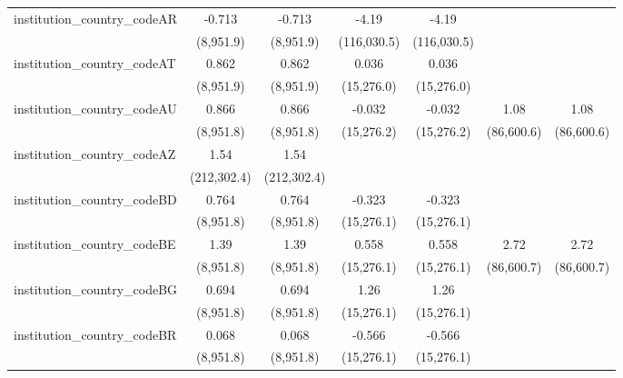 \begin{tabular}{lcccccc}
   institution\_country\_codeAR          & -0.713        & -0.713        & -4.19         & -4.19         &              &   \\   
                                         & (8,951.9)     & (8,951.9)     & (116,030.5)   & (116,030.5)   &              &   \\   
   institution\_country\_codeAT          & 0.862         & 0.862         & 0.036         & 0.036         &              &   \\   
                                         & (8,951.9)     & (8,951.9)     & (15,276.0)    & (15,276.0)    &              &   \\   
   institution\_country\_codeAU          & 0.866         & 0.866         & -0.032        & -0.032        & 1.08         & 1.08\\   
                                         & (8,951.8)     & (8,951.8)     & (15,276.2)    & (15,276.2)    & (86,600.6)   & (86,600.6)\\   
   institution\_country\_codeAZ          & 1.54          & 1.54          &               &               &              &   \\   
                                         & (212,302.4)   & (212,302.4)   &               &               &              &   \\   
   institution\_country\_codeBD          & 0.764         & 0.764         & -0.323        & -0.323        &              &   \\   
                                         & (8,951.8)     & (8,951.8)     & (15,276.1)    & (15,276.1)    &              &   \\   
   institution\_country\_codeBE          & 1.39          & 1.39          & 0.558         & 0.558         & 2.72         & 2.72\\   
                                         & (8,951.8)     & (8,951.8)     & (15,276.1)    & (15,276.1)    & (86,600.7)   & (86,600.7)\\   
   institution\_country\_codeBG          & 0.694         & 0.694         & 1.26          & 1.26          &              &   \\   
                                         & (8,951.8)     & (8,951.8)     & (15,276.1)    & (15,276.1)    &              &   \\   
   institution\_country\_codeBR          & 0.068         & 0.068         & -0.566        & -0.566        &              &   \\   
                                         & (8,951.8)     & (8,951.8)     & (15,276.1)    & (15,276.1)    &              &   \\   

\end{tabular}
